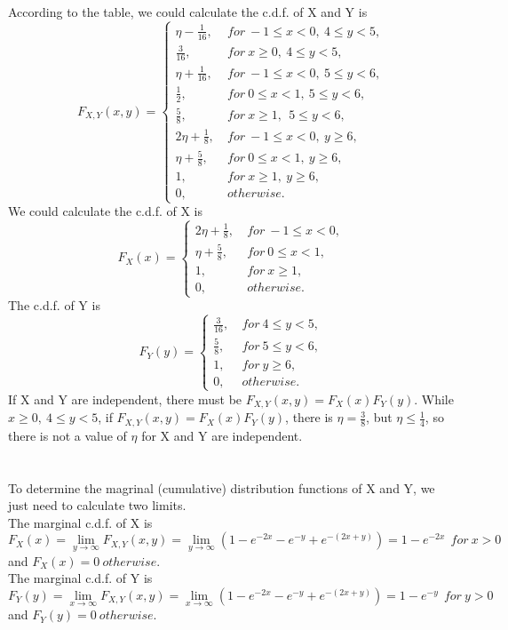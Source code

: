 \documentclass[10.5pt]{article}
\begin{document}
\subsection{}
According to the table, we could calculate the c.d.f. of X and Y is $$F_{X,Y}(x,y) = \begin{cases}
    \eta -\frac{1}{16}, & ~for ~-1\leqslant x <0,~4\leqslant y<5,\\
    \frac{3}{16}, & ~for ~x\geqslant 0,~4\leqslant y<5,\\
    \eta + \frac{1}{16}, & ~for ~-1\leqslant x <0,~5\leqslant y<6,\\
    \frac{1}{2}, & ~for ~0\leqslant x <1,~5\leqslant y<6,\\
    \frac{5}{8}, & ~for ~x\geqslant 1, ~~5\leqslant y<6,\\
    2\eta +\frac{1}{8}, & ~for ~-1\leqslant x<0, ~y\geqslant 6,\\
    \eta +\frac{5}{8}, & ~for ~0\leqslant x<1, ~y\geqslant 6,\\
    1, & ~for ~x\geqslant 1, ~y\geqslant 6,\\
    0, & ~otherwise.
\end{cases}$$\indent
We could calculate the c.d.f. of X is $$F_{X}(x) = \begin{cases}
    2\eta +\frac{1}{8}, & ~for ~-1\leqslant x<0,\\
    \eta +\frac{5}{8}, & ~for ~0\leqslant x<1,\\
    1, & ~for ~x\geqslant 1,\\
    0, & ~otherwise.
\end{cases}$$\indent
The c.d.f. of Y is $$F_{Y}(y) = \begin{cases}
    \frac{3}{16}, & ~for ~4\leqslant y<5,\\
    \frac{5}{8}, & ~for ~5\leqslant y<6,\\
    1, & ~for ~y\geqslant 6,\\
    0, & ~otherwise.
\end{cases}$$\indent
If X and Y are independent, there must be $F_{X,Y}(x,y) = F_{X}(x)F_{Y}(y)$. While $x\geqslant 0,~4\leqslant y<5$, if $F_{X,Y}(x,y) = F_{X}(x)F_{Y}(y)$, there is $\eta = \frac{3}{8}$, but $\eta \leqslant \frac{1}{4}$, so there is not a value of $\eta$ for X and Y are independent.

\section{}
\subsection{}
To determine the magrinal  (cumulative) distribution functions of X and Y, we just need to calculate two limits.\\\indent
The marginal c.d.f. of X is $$F_X(x) = \lim_{y\to \infty} F_{X,Y}(x,y) = \lim_{y\to \infty} \left(1 - e^{-2x} - e^{-y} + e^{-(2x+y)}\right) = 1-e^{-2x} ~~for ~x>0$$ and $F_X(x) = 0 ~otherwise$.\\\indent
The marginal c.d.f. of Y is $$F_Y(y) = \lim_{x\to \infty} F_{X,Y}(x,y) = \lim_{x\to \infty} \left(1 - e^{-2x} - e^{-y} + e^{-(2x+y)}\right) = 1-e^{-y} ~~for ~y>0$$ and $F_Y(y) = 0 ~otherwise$.\\\indent
\end{document}
